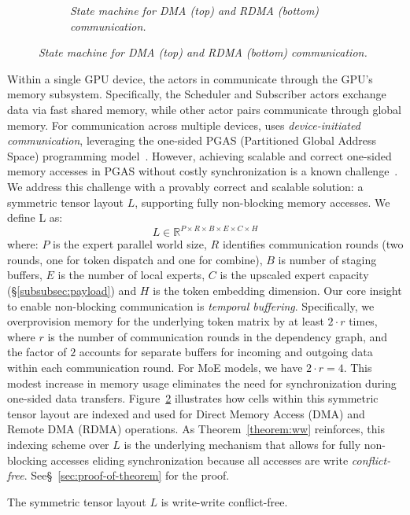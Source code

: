 \begin{figure}[!ht]
\begin{subfigure}{0.25\textwidth}
        \caption{\emph{State machine for DMA (top) and RDMA (bottom) communication.}}
        \label{fig:sm}
    \end{subfigure}
\end{figure}

Within a single GPU device, the actors in \sysname communicate through the GPU's memory subsystem.
Specifically, the Scheduler and Subscriber actors exchange data via fast shared memory, while other actor pairs
communicate through global memory.
For communication across multiple devices, \sysname uses \emph{device-initiated communication},
leveraging the one-sided PGAS (Partitioned Global Address Space) programming model~\cite{10.1145/1278177.1278183}.
However, achieving scalable and correct one-sided memory accesses in PGAS without costly synchronization
is a known challenge~\cite{deepep, triton-dist}.
We address this challenge with a provably correct and scalable solution: a symmetric tensor layout $L$,
supporting fully non-blocking memory accesses.
We define L as:\\
\[
    L \in \mathbb{R}^{P\times R \times B \times E \times C \times H}
\]
where: $P$ is the expert parallel world size, $R$ identifies communication rounds (\ie two rounds,
one for token dispatch and one for combine), $B$ is number of staging buffers,
$E$ is the number of local experts, $C$ is the upscaled expert capacity (\S\ref{subsubsec:payload})
and $H$ is the token embedding dimension.
Our core insight to enable non-blocking communication is \emph{temporal buffering}.
Specifically, we overprovision memory for the underlying token matrix by at least $2 \cdot r$ times, where $r$
is the number of communication rounds in the dependency graph, and the factor of $2$ accounts for
separate buffers for incoming and outgoing data within each communication round.
For MoE models, we have $2 \cdot r = 4$.
This modest increase in memory usage eliminates the need for synchronization during one-sided data transfers.
Figure~\ref{fig:sm} illustrates how cells within this symmetric tensor layout are indexed
and used for Direct Memory Access (DMA) and Remote DMA (RDMA) operations.
As Theorem~\ref{theorem:ww} reinforces,
this indexing scheme over $L$ is the underlying mechanism that allows for fully non-blocking accesses eliding
synchronization because all accesses are write \emph{conflict-free}.
See\S~\ref{sec:proof-of-theorem} for the proof.
\begin{theorem}\label{theorem:ww}
   The symmetric tensor layout $L$ is write-write conflict-free.
\end{theorem}

